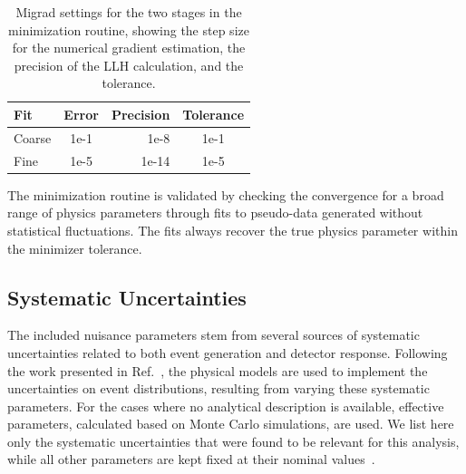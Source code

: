 \documentclass[
    aps,
    prd,
    reprint,
    amsmath,
    amssymb,
    nofootinbib,
    superscriptaddress,
    floatfix
]{revtex4-2}
\begin{document}
\begin{table}[h]
        \begin{tabular}{ lcrc }
        \hline\hline
        \textbf{Fit} & \textbf{Error} & \textbf{Precision} & \textbf{Tolerance} \\
        \hline\hline
        Coarse & 1e-1 & 1e-8 & 1e-1 \\
        Fine & 1e-5 & 1e-14 & 1e-5 \\
        \hline
        \end{tabular}
    \caption{Migrad settings for the two stages in the minimization routine, showing the step size for the numerical gradient estimation, the precision of the LLH calculation, and the tolerance.}
    \label{tab:minimization_settings}
\end{table}

The minimization routine is validated by checking the convergence for a broad range of physics parameters through fits to pseudo-data generated without statistical fluctuations.
The fits always recover the true physics parameter within the minimizer tolerance.


\subsection{\label{sec:uncertainties} Systematic Uncertainties}

The included nuisance parameters stem from several sources of systematic uncertainties related to both event generation and detector response. Following the work presented in Ref.~\cite{IceCubeCollaboration:2023wtb}, the physical models are used to implement the uncertainties on event distributions, resulting from varying these systematic parameters. For the cases where no analytical description is available, effective parameters, calculated based on Monte Carlo simulations, are used. We list here only the systematic uncertainties that were found to be relevant for this analysis, while all other parameters are kept fixed at their nominal values~\cite{Fischer_2023}.
\end{document}
